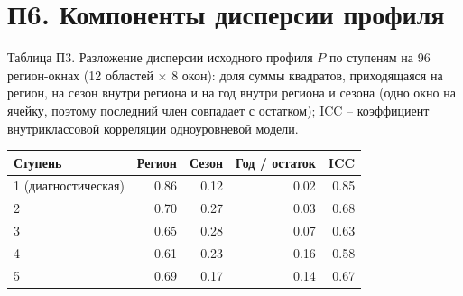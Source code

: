 \documentclass[12pt,a4paper]{article}
\begin{document}
\section*{П6. Компоненты дисперсии профиля}

\noindent Таблица П3. Разложение дисперсии исходного профиля $P$ по ступеням на 96 регион-окнах (12 областей $\times$ 8 окон): доля суммы квадратов, приходящаяся на регион, на сезон внутри региона и на год внутри региона и сезона (одно окно на ячейку, поэтому последний член совпадает с остатком); ICC -- коэффициент внутриклассовой корреляции одноуровневой модели.

\begin{singlespace}
\noindent\begin{tabular}{@{}lrrrr@{}}
\toprule
Ступень & Регион & Сезон & Год / остаток & ICC\\
\midrule
1 (диагностическая) & 0.86 & 0.12 & 0.02 & 0.85\\
2 & 0.70 & 0.27 & 0.03 & 0.68\\
3 & 0.65 & 0.28 & 0.07 & 0.63\\
4 & 0.61 & 0.23 & 0.16 & 0.58\\
5 & 0.69 & 0.17 & 0.14 & 0.67\\
\bottomrule
\end{tabular}
\end{singlespace}
\end{document}
